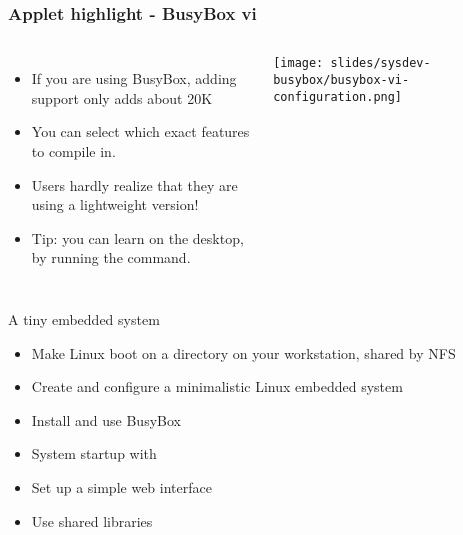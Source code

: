 \begin{frame}
  \frametitle{Applet highlight - BusyBox vi}
  \begin{columns}
      \begin{itemize}
      \item If you are using BusyBox, adding  support only adds
        about 20K
      \item You can select which exact features to compile in.
      \item Users hardly realize that they are using a lightweight 
        version!
      \item Tip: you can learn  on the desktop, by running the 
        command.
      \end{itemize}
      \texttt{[image: slides/sysdev-busybox/busybox-vi-configuration.png]}
  \end{columns}
\end{frame}

\setuplabframe
{A tiny embedded system}
{
  \begin{itemize}
  \item Make Linux boot on a directory on your workstation, shared by NFS
  \item Create and configure a minimalistic Linux embedded system
  \item Install and use BusyBox
  \item System startup with 
  \item Set up a simple web interface
  \item Use shared libraries
  \end{itemize}
}
